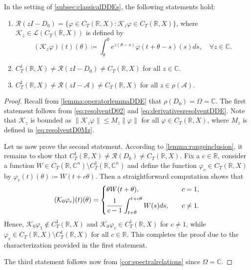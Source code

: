 \documentclass[english]{myarticle}
\begin{document}
\begin{sloppypar}
\begin{proposition} \label{prop:rangenotequal}
In the setting of \cref{subsec:classicalDDEs}, the following statements hold:
\begin{enumerate}
    \item $\mathcal{R}(zI-D_0) = \{ \varphi \in C_T(\mathbb{R},X) : \mathcal{K}_z\varphi \in C_T(\mathbb{R},X) \}$, where $\mathcal{K}_z \in \mathcal{L}(C_T(\mathbb{R},X))$ is defined by
    \begin{equation*}
        (\mathcal{K}_z \varphi)(t)(\theta) \coloneqq \int_\theta^0 e^{z(\theta -s)}\varphi(t + \theta - s)(s) ds, \quad \forall z \in \mathbb{C}.
    \end{equation*}
    \item $C_T^1(\mathbb{R},X) \neq \mathcal{R}(zI-D_0) \neq C_T(\mathbb{R},X)$ for all $z \in \mathbb{C}$.
    \item $C_T^1(\mathbb{R},X) \neq \mathcal{R}(zI-\mathcal{A}) \neq C_T(\mathbb{R},X)$ for all $z \in \rho(\mathcal{A})$.
\end{enumerate}
\begin{proof}
Recall from \cref{lemma:operatorlemmaDDE} that $\rho(D_0) = \Omega = \mathbb{C}$. The first statement follows from \eqref{eq:resolventD02} and \eqref{eq:derivativesresolventDDE}. Note that $\mathcal{K}_z$ is bounded as $\|\mathcal{K}_z \varphi \| \leq M_z \|\varphi\|$ for all $\varphi \in C_T(\mathbb{R},X)$, where $M_z$ is defined in \eqref{eq:resolventD0Mz}.

Let us now prove the second statement. According to \cref{lemma:rangeinclusion}, it remains to show that $C_T^1(\mathbb{R},X) \neq \mathcal{R}(D_0) \neq C_T(\mathbb{R},X)$. Fix a $c \in \mathbb{R}$, consider a function $W\in C_T(\mathbb{R},\mathbb{C}^n) \setminus C_T^1(\mathbb{R},\mathbb{C}^n)$ and define the function $\varphi_c \in C_T(\mathbb{R},X)$ by $\varphi_c(t)(\theta) \coloneqq W(t+c\theta)$. Then a straightforward computation shows that
\begin{equation*}
    (\mathcal{K}_0 \varphi_c)(t)(\theta) =
    \begin{dcases}
        \theta W(t+\theta), \quad &c = 1, \\
        \frac{1}{c-1}\int_{t+\theta}^{t+c\theta}W(s) ds, \quad &c \neq 1.
    \end{dcases}
\end{equation*}
Hence, $\mathcal{K}_0 \varphi_1 \notin C_T^1(\mathbb{R},X)$ and $\mathcal{K}_0 \varphi_c \in C_T^1(\mathbb{R},X)$ for $c \neq 1$, while $\varphi_c \in C_T(\mathbb{R},X) \setminus C_T^1(\mathbb{R},X)$ for all $c \in \mathbb{R}$. This completes the proof due to the characterization provided in the first statement.

The third statement follows now from \cref{cor:spectralrelations} since $\Omega = \mathbb{C}$.
\end{proof}
\end{proposition}




\end{sloppypar}
\end{document}
